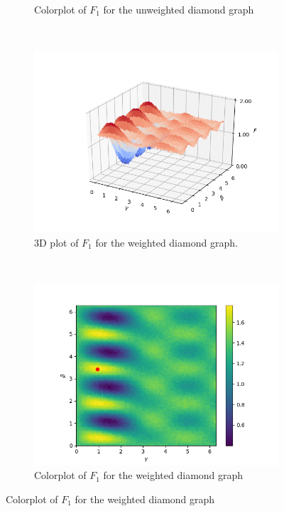 \begin{figure}[H]
\begin{subfigure}[t]{0.42\textwidth}
		\caption{Colorplot of $F_1$ for the unweighted diamond graph}
	\end{subfigure}
	\\
	\centering
	\begin{subfigure}[t]{0.45\textwidth}
		\centering
		\includegraphics[width=\textwidth]{figures/landscape_new/diamond_weighted_3D.png}
		\caption{3D plot of $F_1$ for the weighted diamond graph.}
	\end{subfigure}%
	~ 
	\begin{subfigure}[t]{0.45\textwidth}
		\centering
		\includegraphics[width=\textwidth]{figures/landscape_new/diamond_weighted_imshow.png}
		\caption{Colorplot of $F_1$ for the weighted diamond graph}
	\end{subfigure}

\end{figure}
